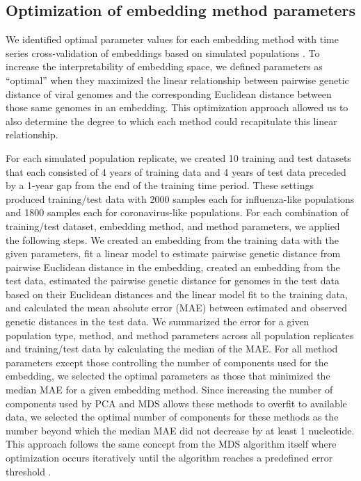 \documentclass[10pt,letterpaper]{article}
\begin{document}
\subsection*{Optimization of embedding method parameters}

We identified optimal parameter values for each embedding method with time series cross-validation of embeddings based on simulated populations \cite{HyndmanAthanasopoulos2021}.
To increase the interpretability of embedding space, we defined parameters as ``optimal'' when they maximized the linear relationship between pairwise genetic distance of viral genomes and the corresponding Euclidean distance between those same genomes in an embedding.
This optimization approach allowed us to also determine the degree to which each method could recapitulate this linear relationship.

For each simulated population replicate, we created 10 training and test datasets that each consisted of 4 years of training data and 4 years of test data preceded by a 1-year gap from the end of the training time period.
These settings produced training/test data with 2000 samples each for influenza-like populations and 1800 samples each for coronavirus-like populations.
For each combination of training/test dataset, embedding method, and method parameters, we applied the following steps.
We created an embedding from the training data with the given parameters, fit a linear model to estimate pairwise genetic distance from pairwise Euclidean distance in the embedding, created an embedding from the test data, estimated the pairwise genetic distance for genomes in the test data based on their Euclidean distances and the linear model fit to the training data, and calculated the mean absolute error (MAE) between estimated and observed genetic distances in the test data.
We summarized the error for a given population type, method, and method parameters across all population replicates and training/test data by calculating the median of the MAE.
For all method parameters except those controlling the number of components used for the embedding, we selected the optimal parameters as those that minimized the median MAE for a given embedding method.
Since increasing the number of components used by PCA and MDS allows these methods to overfit to available data, we selected the optimal number of components for these methods as the number beyond which the median MAE did not decrease by at least 1 nucleotide.
This approach follows the same concept from the MDS algorithm itself where optimization occurs iteratively until the algorithm reaches a predefined error threshold \cite{hout_papesh_goldinger_2012}.
\end{document}
